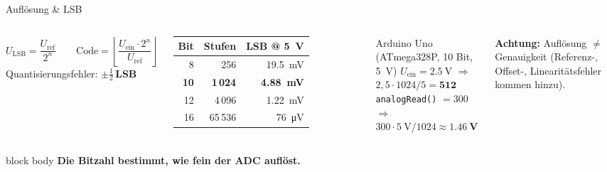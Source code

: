 \documentclass[aspectratio=169,11pt]{beamer}
\newcommand{\kernaussage}[1]{%
  \begin{beamercolorbox}[sep=6pt,rounded=true]{block body}%
  \textbf{#1}\end{beamercolorbox}}
\begin{document}
\begin{frame}{Auflösung \& LSB}
  \begin{columns}[T]
    \[ U_\text{LSB}=\frac{U_\text{ref}}{2^n} \qquad \text{Code}=\left\lfloor\frac{U_\text{ein}\cdot 2^n}{U_\text{ref}}\right\rfloor \]
    Quantisierungsfehler: \textbf{$\pm\frac12$\,LSB}\\[2mm]
    \small
    \begin{tabular}{rrr}
      \toprule
      Bit & Stufen & LSB @ \SI{5}{\volt}\\ \midrule
      8 & 256 & \SI{19.5}{\milli\volt}\\
      \textbf{10} & \textbf{1\,024} & \textbf{\SI{4.88}{\milli\volt}}\\
      12 & 4\,096 & \SI{1.22}{\milli\volt}\\
      16 & 65\,536 & \SI{76}{\micro\volt}\\ \bottomrule
    \end{tabular}
    \begin{block}{Arduino Uno (ATmega328P, 10 Bit, \SI{5}{\volt})}
      \small
      $U_\text{ein}=\SI{2.5}{\volt}$ $\Rightarrow$ $2{,}5\cdot1024/5 = \mathbf{512}$\\[2mm]
      \texttt{analogRead()} $=300$ $\Rightarrow$ $300\cdot\SI{5}{\volt}/1024\approx\mathbf{\SI{1.46}{\volt}}$
    \end{block}
    \vspace{2mm}
    \footnotesize\textbf{Achtung:} Auflösung $\neq$ Genauigkeit (Referenz-, Offset-, Linearitätsfehler kommen hinzu).
  \end{columns}
  \vspace{2mm}
  \kernaussage{Die Bitzahl bestimmt, wie fein der ADC auflöst.}
\end{frame}
\end{document}
